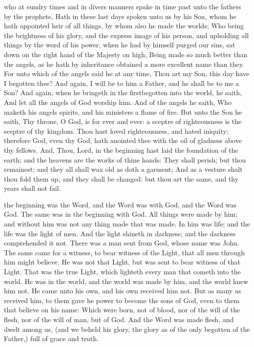  who at sundry times and in divers manners spake in time past unto the fathers by the prophets, Hath in these last days spoken unto us by his Son, whom he hath appointed heir of all things, by whom also he made the worlds; Who being the brightness of his glory, and the express image of his person, and upholding all things by the word of his power, when he had by himself purged our sins, sat down on the right hand of the Majesty on high; Being made so much better than the angels, as he hath by inheritance obtained a more excellent name than they. For unto which of the angels said he at any time, Thou art my Son, this day have I begotten thee? And again, I will be to him a Father, and he shall be to me a Son? And again, when he bringeth in the firstbegotten into the world, he saith, And let all the angels of God worship him. And of the angels he saith, Who maketh his angels spirits, and his ministers a flame of fire. But unto the Son he saith, Thy throne, O God, is for ever and ever: a sceptre of righteousness is the sceptre of thy kingdom. Thou hast loved righteousness, and hated iniquity; therefore God, even thy God, hath anointed thee with the oil of gladness above thy fellows. And, Thou, Lord, in the beginning hast laid the foundation of the earth; and the heavens are the works of thine hands: They shall perish; but thou remainest; and they all shall wax old as doth a garment; And as a vesture shalt thou fold them up, and they shall be changed: but thou art the same, and thy years shall not fail.


 the beginning was the Word, and the Word was with God, and the Word was God. The same was in the beginning with God. All things were made by him; and without him was not any thing made that was made. In him was life; and the life was the light of men. And the light shineth in darkness; and the darkness comprehended it not. There was a man sent from God, whose name was John. The same came for a witness, to bear witness of the Light, that all men through him might believe. He was not that Light, but was sent to bear witness of that Light. That was the true Light, which lighteth every man that cometh into the world. He was in the world, and the world was made by him, and the world knew him not. He came unto his own, and his own received him not. But as many as received him, to them gave he power to become the sons of God, even to them that believe on his name: Which were born, not of blood, nor of the will of the flesh, nor of the will of man, but of God.  And the Word was made flesh, and dwelt among us, (and we beheld his glory, the glory as of the only begotten of the Father,) full of grace and truth.


